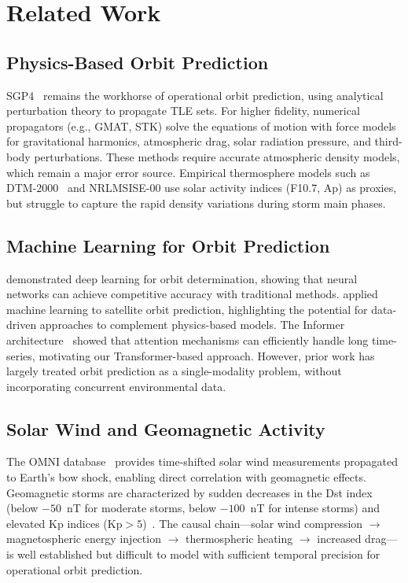 \documentclass[twocolumn]{article}
\begin{document}
\section{Related Work}
\label{sec:related}

\subsection{Physics-Based Orbit Prediction}

SGP4~\citep{vallado2006revisiting} remains the workhorse of operational
orbit prediction, using analytical perturbation theory to propagate TLE
sets. For higher fidelity, numerical propagators (e.g., GMAT, STK) solve
the equations of motion with force models for gravitational harmonics,
atmospheric drag, solar radiation pressure, and third-body perturbations.
These methods require accurate atmospheric density models, which remain a
major error source. Empirical thermosphere models such as
DTM-2000~\citep{bruinsma2004thermosphere} and NRLMSISE-00 use solar
activity indices (F10.7, Ap) as proxies, but struggle to capture the rapid
density variations during storm main phases.

\subsection{Machine Learning for Orbit Prediction}

\citet{peng2020deep} demonstrated deep learning for orbit determination,
showing that neural networks can achieve competitive accuracy with
traditional methods. \citet{licata2022machine} applied machine learning to
satellite orbit prediction, highlighting the potential for data-driven
approaches to complement physics-based models. The Informer
architecture~\citep{zhou2021informer} showed that attention mechanisms can
efficiently handle long time-series, motivating our Transformer-based
approach. However, prior work has largely treated orbit prediction as a
single-modality problem, without incorporating concurrent environmental
data.

\subsection{Solar Wind and Geomagnetic Activity}

The OMNI database~\citep{king2005solar} provides time-shifted solar wind
measurements propagated to Earth's bow shock, enabling direct correlation
with geomagnetic effects. Geomagnetic storms are characterized by sudden
decreases in the Dst index (below $-50$~nT for moderate storms, below
$-100$~nT for intense storms) and elevated Kp indices
($\text{Kp} > 5$)~\citep{gonzalez1994geomagnetic}. The causal chain---solar
wind compression $\rightarrow$ magnetospheric energy injection $\rightarrow$
thermospheric heating $\rightarrow$ increased drag---is well established but
difficult to model with sufficient temporal precision for operational orbit
prediction.
\end{document}
